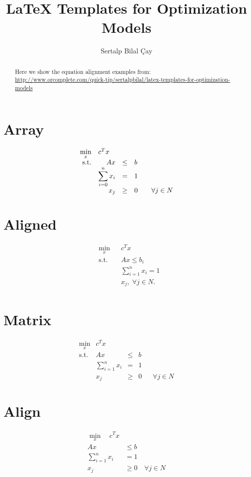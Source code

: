 \documentclass[a4paper]{article}
\title{LaTeX Templates for Optimization Models}
\author{Sertalp Bilal Çay}
\begin{document}
\maketitle

\begin{abstract}
Here we show the equation alignment examples from:\\ \url{http://www.orcomplete.com/quick-tip/sertalpbilal/latex-templates-for-optimization-models}
\end{abstract}

\section{Array} %

\begin{equation}
\begin{array}{rrclcl}
\displaystyle \min_{x} & \multicolumn{3}{l}{c^T x} \\
\textrm{s.t.} & A x & \leq & b \\
&\displaystyle \sum_{i=0}^{n} x_i & = & 1 \\
& x_j & \geq & 0 & & \forall j \in N \\
\end{array}
\end{equation}

\section{Aligned} %

\begin{equation}
\begin{aligned}
& \underset{x}{\text{min}}
& & c^T x \\
& \text{s.t.} & &  Ax \leq b_i \\
& & &  \sum_{i=1}^{n} x_i =1 \\
& & &  x_j, \; \forall j \in N. \\
\end{aligned}
\end{equation}

\section{Matrix} %

\begin{equation}
\begin{matrix}
\displaystyle \min_x & c^T x  \\
\textrm{s.t.} & A x & \leq & b  \\
& \displaystyle \sum_{i=1}^{n} x_i & = & 1  \\
& x_j & \geq & 0 & & \forall j \in N
\end{matrix}
\end{equation}

\section{Align} %

\begin{align*}
\min_x \quad c^T x \\
Ax &\leq b \\
\sum_{i=1}^n x_i &= 1\\
x_j &\geq 0 \quad \forall j \in N
\end{align*}
\end{document}
